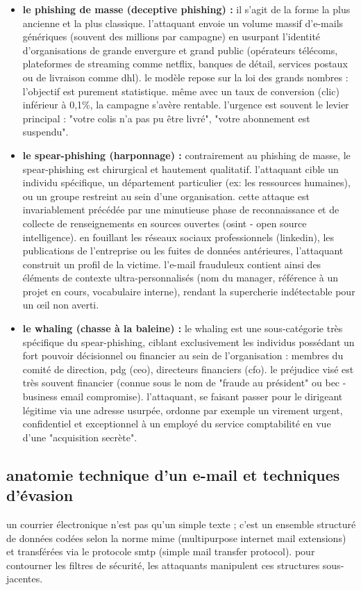 \documentclass[12pt,a4paper]{report}
\begin{document}
\begin{itemize}
    \item \textbf{le phishing de masse (deceptive phishing) :} il s'agit de la forme la plus ancienne et la plus classique. l'attaquant envoie un volume massif d'e-mails génériques (souvent des millions par campagne) en usurpant l'identité d'organisations de grande envergure et grand public (opérateurs télécoms, plateformes de streaming comme netflix, banques de détail, services postaux ou de livraison comme dhl). le modèle repose sur la loi des grands nombres : l'objectif est purement statistique. même avec un taux de conversion (clic) inférieur à 0,1\%, la campagne s'avère rentable. l'urgence est souvent le levier principal : "votre colis n'a pas pu être livré", "votre abonnement est suspendu".
    
    \item \textbf{le spear-phishing (harponnage) :} contrairement au phishing de masse, le spear-phishing est chirurgical et hautement qualitatif. l'attaquant cible un individu spécifique, un département particulier (ex: les ressources humaines), ou un groupe restreint au sein d'une organisation. cette attaque est invariablement précédée par une minutieuse phase de reconnaissance et de collecte de renseignements en sources ouvertes (osint - open source intelligence). en fouillant les réseaux sociaux professionnels (linkedin), les publications de l'entreprise ou les fuites de données antérieures, l'attaquant construit un profil de la victime. l'e-mail frauduleux contient ainsi des éléments de contexte ultra-personnalisés (nom du manager, référence à un projet en cours, vocabulaire interne), rendant la supercherie indétectable pour un œil non averti.
    
    \item \textbf{le whaling (chasse à la baleine) :} le whaling est une sous-catégorie très spécifique du spear-phishing, ciblant exclusivement les individus possédant un fort pouvoir décisionnel ou financier au sein de l'organisation : membres du comité de direction, pdg (ceo), directeurs financiers (cfo). le préjudice visé est très souvent financier (connue sous le nom de "fraude au président" ou bec - business email compromise). l'attaquant, se faisant passer pour le dirigeant légitime via une adresse usurpée, ordonne par exemple un virement urgent, confidentiel et exceptionnel à un employé du service comptabilité en vue d'une "acquisition secrète".
\end{itemize}

\subsection{anatomie technique d'un e-mail et techniques d'évasion}
un courrier électronique n'est pas qu'un simple texte ; c'est un ensemble structuré de données codées selon la norme mime (multipurpose internet mail extensions) et transférées via le protocole smtp (simple mail transfer protocol). pour contourner les filtres de sécurité, les attaquants manipulent ces structures sous-jacentes.
\end{document}
